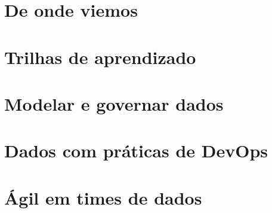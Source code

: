 \documentclass[11pt,twoside,openright,showtrims]{memoir}
\begin{document}
\frontmatter


\tableofcontents*



\mainmatter

\part{De onde viemos}
\label{parte:origens}







\part{Trilhas de aprendizado}
\label{parte:trilhas}







\part{Modelar e governar dados}
\label{parte:modelagem}








\part{Dados com práticas de DevOps}
\label{parte:devops}







\part{Ágil em times de dados}
\label{parte:agil}









\appendix


\backmatter
\printbibliography[heading=bibintoc,title={Referências}]

\end{document}
